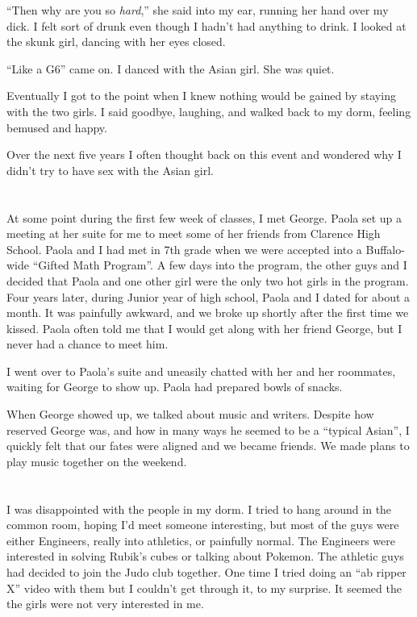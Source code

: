 ``Then why are you so \textit{hard},'' she said into my ear, running her hand
over my dick.  I felt sort of drunk even though I hadn't had anything to drink.
I looked at the skunk girl, dancing with her eyes closed.  

``Like a G6'' came on.  I danced with the Asian girl.  She was quiet.

Eventually I got to the point when I knew nothing would be gained by staying
with the two girls.  I said goodbye, laughing, and walked back to my dorm,
feeling bemused and happy. 

Over the next five years I often thought back on this event and wondered why I
didn't try to have sex with the Asian girl.  

\section{}

At some point during the first few week of classes, I met George.  Paola set up
a meeting at her suite for me to meet some of her friends from Clarence High
School.  Paola and I had met in 7th grade when we were accepted into a
Buffalo-wide ``Gifted Math Program''.  A few days into the program, the other
guys and I decided that Paola and one other girl were the only two hot girls in
the program.  Four years later, during Junior year of high school, Paola and I
dated for about a month.  It was painfully awkward, and we broke up shortly
after the first time we kissed.  Paola often told me that I would get along with
her friend George, but I never had a chance to meet him. 

I went over to Paola's suite and uneasily chatted with her and her
roommates, waiting for George to show up.  Paola had prepared bowls of snacks.

When George showed up, we talked about music and writers.  Despite how reserved
George was, and how in many ways he seemed to be a ``typical Asian'', I quickly
felt that our fates were aligned and we became friends.  We made plans to play
music together on the weekend.

\section{}

I was disappointed with the people in my dorm.  I tried to hang around in the
common room, hoping I'd meet someone interesting, but most of the guys were
either Engineers, really into athletics, or painfully normal.  The Engineers
were interested in solving Rubik's cubes or talking about Pokemon.  The athletic
guys had decided to join the Judo club together.  One time I tried doing an ``ab
ripper X'' video with them but I couldn't get through it, to my surprise.  It
seemed the the girls were not very interested in me.

